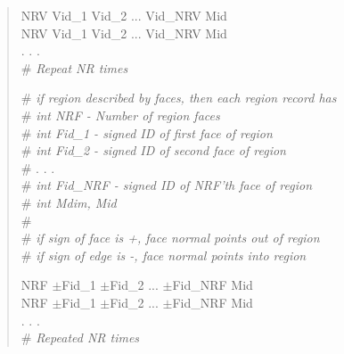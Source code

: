 \documentclass[12pt]{article}
\begin{document}
\begin{verse}
NRV \hspace{0.5ex} Vid\_1 \hspace{0.5ex} Vid\_2 \hspace{0.5ex} ... \hspace{0.5ex} Vid\_NRV \hspace{0.5ex} Mid \\
NRV \hspace{0.5ex} Vid\_1 \hspace{0.5ex} Vid\_2 \hspace{0.5ex} ... \hspace{0.5ex} Vid\_NRV \hspace{0.5ex} Mid \\
. . . \\
\# \textit{Repeat NR times} 
\vspace{3ex}

\# \textit{if region described by faces, then each region record has} \\
\# \textit{int NRF - Number of region faces} \\
\# \textit{int Fid\_1 - signed ID of first face of region} \\
\# \textit{int Fid\_2 - signed ID of second face of region} \\
\# . . . \\
\# \textit{int Fid\_NRF - signed ID of NRF'th face of region} \\
\# \textit{int Mdim, Mid} \\
\#  \\
\# \textit{if sign of face is +, face normal points out of region} \\
\# \textit{if sign of edge is -, face normal points into region}
\vspace{1ex}

NRF \hspace{0.5ex} $\pm$Fid\_1 \hspace{0.5ex} $\pm$Fid\_2 \hspace{0.5ex} ... \hspace{0.5ex} $\pm$Fid\_NRF \hspace{0.5ex} Mid \\
NRF \hspace{0.5ex} $\pm$Fid\_1 \hspace{0.5ex} $\pm$Fid\_2 \hspace{0.5ex} ... \hspace{0.5ex} $\pm$Fid\_NRF \hspace{0.5ex} Mid \\
. . . \\
\# \textit{Repeated NR times} 
\vspace{2ex}


\end{verse}
\end{document}
